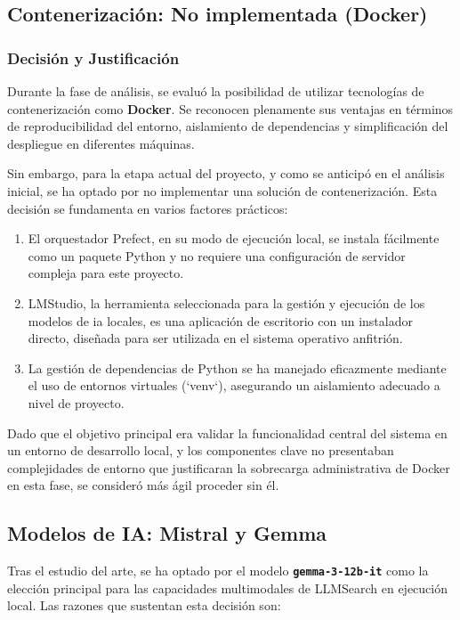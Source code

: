 \subsection{Contenerización: No implementada (Docker)}
\label{subsec:decision_docker}
\subsubsection{Decisión y Justificación}
Durante la fase de análisis, se evaluó la posibilidad de utilizar tecnologías de contenerización como \textbf{Docker}. Se reconocen plenamente sus ventajas en términos de reproducibilidad del entorno, aislamiento de dependencias y simplificación del despliegue en diferentes máquinas.

Sin embargo, para la etapa actual del proyecto, y como se anticipó en el análisis inicial, se ha optado por no implementar una solución de contenerización. Esta decisión se fundamenta en varios factores prácticos:
\begin{enumerate}
    \item El orquestador Prefect, en su modo de ejecución local, se instala fácilmente como un paquete Python y no requiere una configuración de servidor compleja para este proyecto.
    \item LMStudio, la herramienta seleccionada para la gestión y ejecución de los modelos de \gls{ia} locales, es una aplicación de escritorio con un instalador directo, diseñada para ser utilizada en el sistema operativo anfitrión.
    \item La gestión de dependencias de Python se ha manejado eficazmente mediante el uso de entornos virtuales (`venv`), asegurando un aislamiento adecuado a nivel de proyecto.
\end{enumerate}
Dado que el objetivo principal era validar la funcionalidad central del sistema en un entorno de desarrollo local, y los componentes clave no presentaban complejidades de entorno que justificaran la sobrecarga administrativa de Docker en esta fase, se consideró más ágil proceder sin él.

\subsection{Modelos de IA: Mistral y Gemma}
\label{subsec:decision_models}
Tras el estudio del arte, se ha optado por el modelo \textbf{\texttt{gemma-3-12b-it}} como la elección principal para las capacidades multimodales de LLMSearch en ejecución local. Las razones que sustentan esta decisión son:


